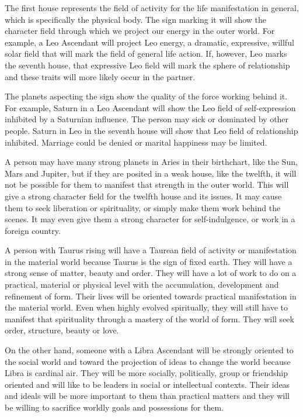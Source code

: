 The first house represents the field of activity for the life manifestation in general, which is specifically the physical body. The sign marking it will show the character field through which we project our energy in the outer world. For example, a Leo Ascendant will project Leo energy, a dramatic, expressive, willful solar field that will mark the field of general life action. If, however, Leo marks the seventh house, that expressive Leo field will mark the sphere of relationship and these traits will more likely occur in the partner.

 

The planets aspecting the sign show the quality of the force working behind it. For example, Saturn in a Leo Ascendant will show the Leo field of self-expression inhibited by a Saturnian influence. The person may sick or dominated by other people. Saturn in Leo in the seventh house will show that Leo field of relationship inhibited. Marriage could be denied or marital happiness may be limited.

 

A person may have many strong planets in Aries in their birthchart, like the Sun, Mars and Jupiter, but if they are posited in a weak house, like the twelfth, it will not be possible for them to manifest that strength in the outer world. This will give a strong character field for the twelfth house and its issues. It may cause them to seek liberation or spirituality, or simply make them work behind the scenes. It may even give them a strong character for self-indulgence, or work in a foreign country.

 

A person with Taurus rising will have a Taurean field of activity or manifestation in the material world because Taurus is the sign of fixed earth. They will have a strong sense of matter, beauty and order. They will have a lot of work to do on a practical, material or physical level with the accumulation, development and refinement of form. Their lives will be oriented towards practical manifestation in the material world. Even when highly evolved spiritually, they will still have to manifest that spirituality through a mastery of the world of form. They will seek order, structure, beauty or love.

 

On the other hand, someone with a Libra Ascend­ant will be strongly oriented to the social world and toward the projection of ideas to change the world because Libra is cardinal air. They will be more socially, politically, group or friendship oriented and will like to be leaders in social or intellectual contexts. Their ideas and ideals will be more important to them than practical matters and they will be willing to sacrifice worldly goals and possessions for them.

